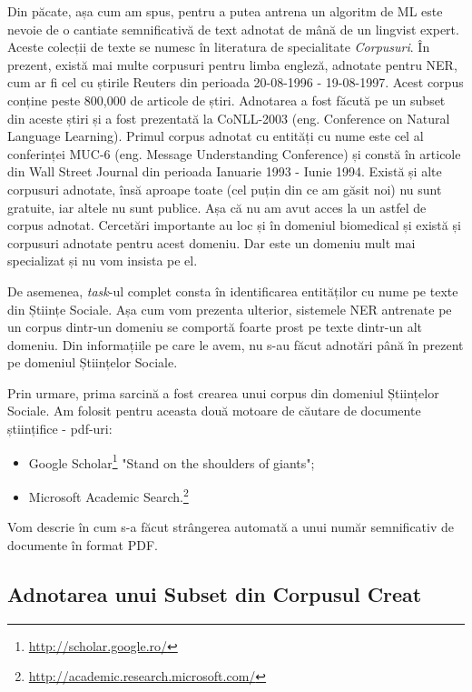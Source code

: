 Din păcate, așa cum am spus, pentru a putea antrena un algoritm de ML este nevoie de o cantiate semnificativă de text adnotat de mână de un lingvist expert. Aceste colecții de texte se numesc în literatura de specialitate \textit{Corpusuri}. În prezent, există mai multe corpusuri pentru limba engleză, adnotate pentru NER, cum ar fi cel cu știrile Reuters din perioada 20-08-1996 - 19-08-1997.\cite{rcv1} Acest corpus conține peste 800,000 de articole de știri. Adnotarea a fost făcută pe un subset din aceste știri și a fost prezentată la CoNLL-2003\cite{conll2003} (eng. Conference on Natural Language Learning). Primul corpus adnotat cu entități cu nume este cel al conferinței MUC-6 (eng. Message Understanding Conference) și constă în articole din Wall Street Journal din perioada Ianuarie 1993 - Iunie 1994.  Există și alte corpusuri adnotate, însă aproape toate (cel puțin din ce am găsit noi) nu sunt gratuite, iar altele nu sunt publice. Așa că nu am avut acces la un astfel de corpus adnotat. Cercetări importante au loc și în domeniul biomedical și există și corpusuri adnotate pentru acest domeniu. Dar este un domeniu mult mai specializat și nu vom insista pe el.

De asemenea, \textit{task}-ul complet consta în identificarea entităților cu nume pe texte din Științe Sociale. Așa cum vom prezenta ulterior, sistemele NER antrenate pe un corpus dintr-un domeniu se comportă foarte prost pe texte dintr-un alt domeniu. Din informațiile pe care le avem, nu s-au făcut adnotări până în prezent pe domeniul Științelor Sociale.

Prin urmare, prima sarcină a fost crearea unui corpus din domeniul Științelor Sociale. Am folosit pentru aceasta două motoare de căutare de documente științifice - pdf-uri:

\begin{itemize}
\item Google Scholar\footnote{\url{http://scholar.google.ro/}} "Stand on the shoulders of giants";
\item Microsoft Academic Search.\footnote{\url{http://academic.research.microsoft.com/}}
\end{itemize}

Vom descrie în  cum s-a făcut strângerea automată a unui număr semnificativ de documente în format PDF.

\subsection{Adnotarea unui Subset din Corpusul Creat}

